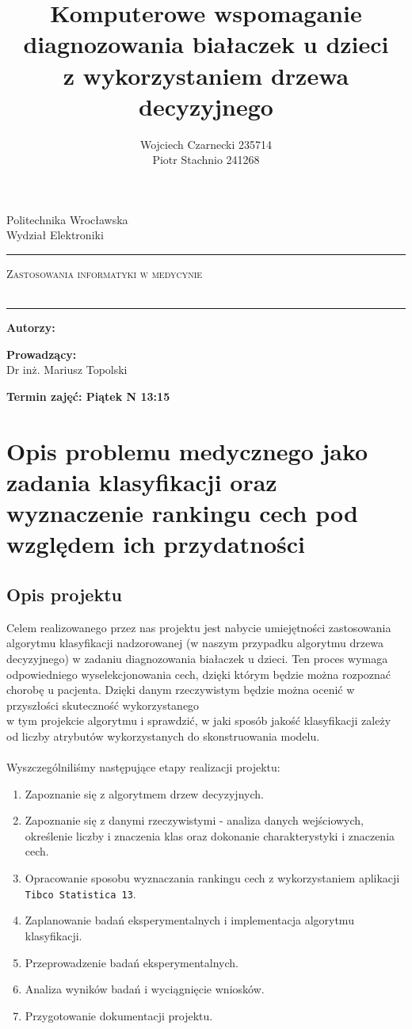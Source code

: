 \documentclass{article}
\title{Komputerowe wspomaganie diagnozowania białaczek u dzieci \\z wykorzystaniem drzewa decyzyjnego}
\author{Wojciech Czarnecki \hspace{.2cm} 235714\\ Piotr Stachnio \hspace{.9cm} 241268\\}
\makeatletter
\newcommand{\linia}{\rule{\linewidth}{0.4mm}}
\renewcommand{\maketitle}{
\begin{titlepage}		

	\vspace{2cm}

	\centering\huge Politechnika Wrocławska\\
	\vspace{0.3cm}
	\centering\LARGE Wydział Elektroniki\\
	
	\vspace{2cm}
	
	\noindent\linia
	\begin{center}	
		\huge \textsc{Zastosowania informatyki w medycynie}\\
		\vspace{0.3cm}
		\LARGE \@title\\	
	\end{center}
	\linia

	\begin{center}
		\vspace{3cm}
		\textbf{\Large Autorzy:}\\
			\Large\@author \hspace{.3cm}
	\end{center}

	\begin{center}
		\vspace{2cm}	
		\textbf{\Large Prowadzący:}\\
		\Large Dr inż. Mariusz Topolski\\
	\end{center}

	\begin{center}
		\vspace{2cm}	
		\textbf{\Large Termin zajęć: Piątek N 13:15}\\
	\end{center}
	
	\end{titlepage}%
}
\makeatother
\begin{document}
\maketitle

\tableofcontents

\newpage

\section{Opis problemu medycznego jako zadania klasyfikacji oraz wyznaczenie rankingu
cech pod względem ich przydatności}

\subsection{Opis projektu}
\quad Celem realizowanego przez nas projektu jest nabycie umiejętności zastosowania algorytmu klasyfikacji nadzorowanej (w naszym przypadku algorytmu drzewa decyzyjnego) w zadaniu diagnozowania białaczek u dzieci. Ten proces wymaga odpowiedniego wyselekcjonowania cech, dzięki którym będzie można rozpoznać chorobę u pacjenta. Dzięki danym rzeczywistym będzie można ocenić w przyszłości skuteczność wykorzystanego\\ w tym projekcie algorytmu i sprawdzić, w jaki sposób jakość klasyfikacji zależy od liczby atrybutów wykorzystanych do skonstruowania modelu.\\
\\Wyszczególniliśmy następujące etapy realizacji projektu:
\begin{enumerate}
    \item Zapoznanie się z algorytmem drzew decyzyjnych.
    \item Zapoznanie się z danymi rzeczywistymi - analiza danych wejściowych, określenie liczby i znaczenia klas oraz dokonanie charakterystyki i znaczenia cech.
    \item Opracowanie sposobu wyznaczania rankingu cech z wykorzystaniem aplikacji \texttt{Tibco Statistica 13}.
    \item Zaplanowanie badań eksperymentalnych i implementacja algorytmu klasyfikacji.
    \item Przeprowadzenie badań eksperymentalnych.
    \item Analiza wyników badań i wyciągnięcie wniosków.
    \item Przygotowanie dokumentacji projektu.\\\\
\end{enumerate}{}
\end{document}
